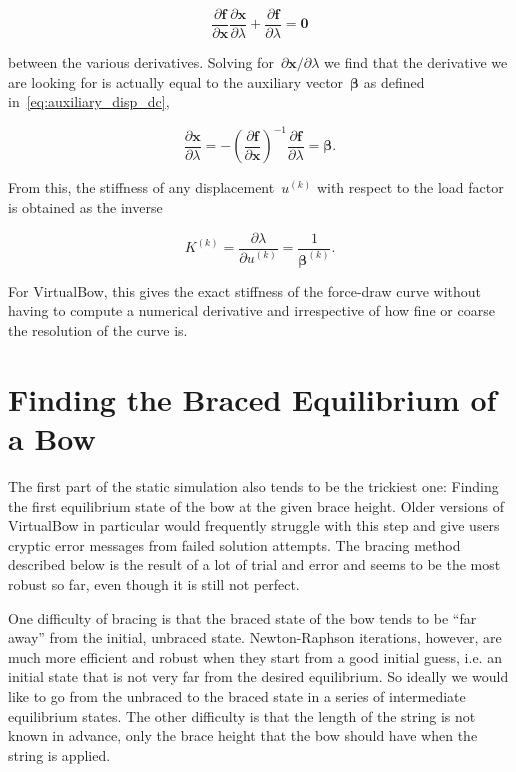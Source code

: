 \begin{equation}
\frac{\partial \boldsymbol{f}}{\partial \boldsymbol{x}}\frac{\partial \boldsymbol{x}}{\partial \lambda} + \frac{\partial \boldsymbol{f}}{\partial \lambda} = \boldsymbol{0}
\end{equation}

between the various derivatives.
Solving for~$\partial \boldsymbol{x}/\partial \lambda$ we find that the derivative we are looking for is actually equal to the auxiliary vector~$\boldsymbol{\beta}$ as defined in~\eqref{eq:auxiliary_disp_dc},

\begin{equation}
\frac{\partial \boldsymbol{x}}{\partial \lambda} = -\left(\frac{\partial \boldsymbol{f}}{\partial \boldsymbol{x}}\right)^{-1}\frac{\partial \boldsymbol{f}}{\partial \lambda} = \boldsymbol{\beta}.
\end{equation}

From this, the stiffness of any displacement~$u^{(k)}$ with respect to the load factor is obtained as the inverse

\begin{equation}
K^{(k)} = \frac{\partial \lambda}{\partial u^{(k)}} = \frac{1}{\boldsymbol{\beta}^{(k)}}.
\end{equation}

For VirtualBow, this gives the exact stiffness of the force-draw curve without having to compute a numerical derivative and irrespective of how fine or coarse the resolution of the curve is.

\newpage
\section{Finding the Braced Equilibrium of a Bow}

The first part of the static simulation also tends to be the trickiest one: Finding the first equilibrium state of the bow at the given brace height.
Older versions of VirtualBow in particular would frequently struggle with this step and give users cryptic error messages from failed solution attempts.
The bracing method described below is the result of a lot of trial and error and seems to be the most robust so far, even though it is still not perfect.

One difficulty of bracing is that the braced state of the bow tends to be ``far away'' from the initial, unbraced state.
Newton-Raphson iterations, however, are much more efficient and robust when they start from a good initial guess, i.e. an initial state that is not very far from the desired equilibrium.
So ideally we would like to go from the unbraced to the braced state in a series of intermediate equilibrium states.
The other difficulty is that the length of the string is not known in advance, only the brace height that the bow should have when the string is applied.

